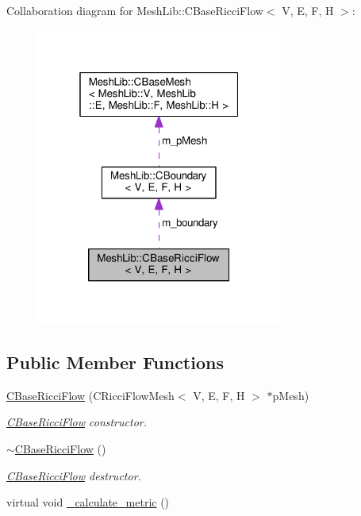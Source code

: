 Collaboration diagram for Mesh\+Lib\+:\+:C\+Base\+Ricci\+Flow$<$ V, E, F, H $>$\+:
\nopagebreak
\begin{figure}[H]
\begin{center}
\leavevmode
\includegraphics[width=229pt]{class_mesh_lib_1_1_c_base_ricci_flow__coll__graph}
\end{center}
\end{figure}
\subsection*{Public Member Functions}
\begin{DoxyCompactItemize}
\item 
\hyperlink{class_mesh_lib_1_1_c_base_ricci_flow_a878d8e94d5d4b83db4ee2a98021588b8}{C\+Base\+Ricci\+Flow} (C\+Ricci\+Flow\+Mesh$<$ V, E, F, H $>$ $\ast$p\+Mesh)
\begin{DoxyCompactList}\small\item\em \hyperlink{class_mesh_lib_1_1_c_base_ricci_flow}{C\+Base\+Ricci\+Flow} constructor. \end{DoxyCompactList}\item 
\hyperlink{class_mesh_lib_1_1_c_base_ricci_flow_a1b714014282163959204adfdec041eae}{$\sim$\+C\+Base\+Ricci\+Flow} ()
\begin{DoxyCompactList}\small\item\em \hyperlink{class_mesh_lib_1_1_c_base_ricci_flow}{C\+Base\+Ricci\+Flow} destructor. \end{DoxyCompactList}\item 
virtual void \hyperlink{class_mesh_lib_1_1_c_base_ricci_flow_a5e43b277b368f38f12c77e6daa9c5cd9}{\+\_\+calculate\+\_\+metric} ()
\end{DoxyCompactItemize}
